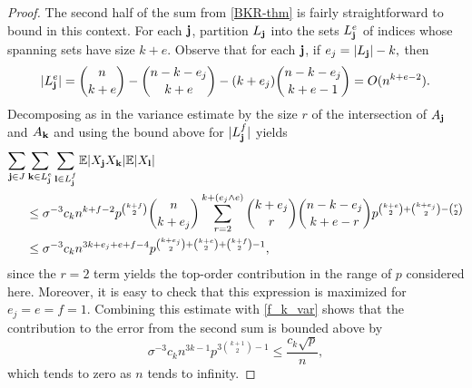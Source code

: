 \documentclass{amsart}
\theoremstyle{definition}
\newcommand{\E}{\mathbb{E}}
\renewcommand{\1}{\mathbb{1}}
\begin{document}
\begin{proof}
The second half of the sum from \eqref{BKR-thm}
is fairly straightforward to bound in this context.  For each ${\bf j}$,
partition $L_{\bf j}$ into the sets $L_{\bf j}^e$ of indices whose spanning
sets have size $k+e$.   
Observe that for each ${\bf j}$, if $e_j=|L_{\bf j}|-k,$ then
$$|L_{\bf j}^e|=\binom{n}{k+e}-\binom{n-k-e_j}{k+e}-(k+e_j)
\binom{n-k-e_j}{k+e-1}=
O(n^{k+e-2}).$$
Decomposing as
in the variance estimate by the size $r$ of the intersection of 
$A_{\bf j}$ and $A_{\bf k}$  and using the bound 
above for $|L_{\bf j}^f|$ yields
\begin{equation*}\begin{split}
\sum_{{\bf j}\in J}&\sum_{{\bf k}\in L_{\bf j}^{e}}\sum_{
{\bf l}\in L_{\bf j}^f}\E|X_{\bf j}X_{\bf k}|\E|X_{\bf l}|\\&\le
\sigma^{-3}
c_kn^{k+f-2}p^{\binom{k+f}{2}}\binom{n}{k+e_j}\sum_{r=2}^{k+(e_j\wedge e)}
\binom{k+e_j}{r}\binom{
n-k-e_j}{k+e-r}p^{\binom{k+e}{2}+\binom{k+e_j}{2}-\binom{r}{2}}\\&\le
\sigma^{-3}c_kn^{3k+e_j+e+f-4}p^{\binom{k+e_j}{2}+\binom{k+e}{2}+\binom{k+f}{2}-1},
\end{split}\end{equation*}
since the $r=2$ term yields the top-order contribution in the
range of $p$ considered here.  Moreover, it is easy to check that this
expression is maximized for $e_j=e=f=1$.    
Combining this estimate with \eqref{f_k_var}
shows that 
the contribution to the error from the second 
sum is bounded above by
$$\sigma^{-3}c_kn^{3k-1}p^{3\binom{k+1}{2}-1}\le \frac{c_k\sqrt{p}}{n},$$
which tends to zero as $n$ tends to infinity.


\end{proof}
\end{document}
